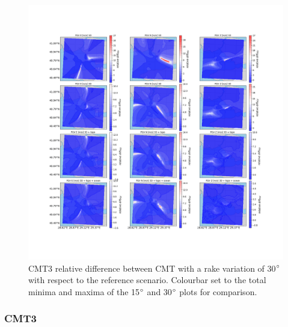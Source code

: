 \documentclass[../Text/00main.tex]{subfiles}
\begin{document}
\begin{figure}[!h]
    \centering
    \includegraphics[width=1\linewidth,trim = 2cm 5cm 1cm 5cm, clip]{images_results/rake_variation_epsilon25_sc2.png}
    \caption{CMT3 relative difference between CMT with a rake variation of 30$\degree$ with respect to the reference scenario. Colourbar set to the total minima and maxima of the 15$\degree$ and 30$\degree$ plots for comparison.}
    \label{fig:ref_eps25-2}
\end{figure}

\subsubsection{CMT3}
\end{document}
